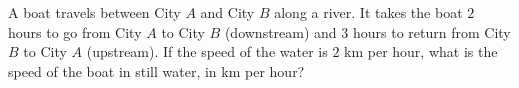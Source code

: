A boat travels between City $A$ and City $B$ along a river. It takes the boat $2$ hours to go from City $A$ to City $B$ (downstream) and $3$ hours to return from City $B$ to City $A$ (upstream). If the speed of the water is $2$ km per hour, what is the speed of the boat in still water, in km per hour?
